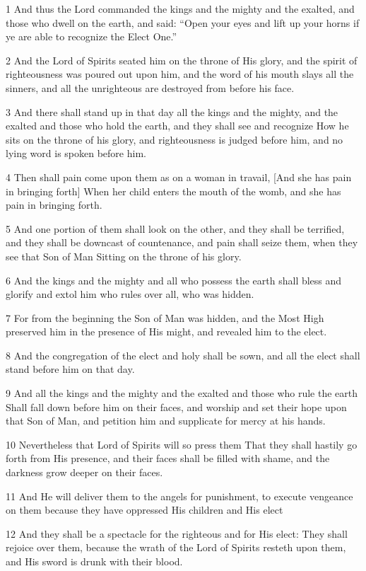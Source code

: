 \par 1 And thus the Lord commanded the kings and the mighty and the exalted, and those who dwell on the earth, and said: “Open your eyes and lift up your horns if ye are able to recognize the Elect One.”
\par 2 And the Lord of Spirits seated him on the throne of His glory, and the spirit of righteousness was poured out upon him, and the word of his mouth slays all the sinners, and all the unrighteous are destroyed from before his face.
\par 3 And there shall stand up in that day all the kings and the mighty, and the exalted and those who hold the earth, and they shall see and recognize How he sits on the throne of his glory, and righteousness is judged before him, and no lying word is spoken before him.
\par 4 Then shall pain come upon them as on a woman in travail, [And she has pain in bringing forth] When her child enters the mouth of the womb, and she has pain in bringing forth.
\par 5 And one portion of them shall look on the other, and they shall be terrified, and they shall be downcast of countenance, and pain shall seize them, when they see that Son of Man Sitting on the throne of his glory.
\par 6 And the kings and the mighty and all who possess the earth shall bless and glorify and extol him who rules over all, who was hidden.
\par 7 For from the beginning the Son of Man was hidden, and the Most High preserved him in the presence of His might, and revealed him to the elect.
\par 8 And the congregation of the elect and holy shall be sown, and all the elect shall stand before him on that day.
\par 9 And all the kings and the mighty and the exalted and those who rule the earth Shall fall down before him on their faces, and worship and set their hope upon that Son of Man, and petition him and supplicate for mercy at his hands.
\par 10 Nevertheless that Lord of Spirits will so press them That they shall hastily go forth from His presence, and their faces shall be filled with shame, and the darkness grow deeper on their faces.
\par 11 And He will deliver them to the angels for punishment, to execute vengeance on them because they have oppressed His children and His elect
\par 12 And they shall be a spectacle for the righteous and for His elect: They shall rejoice over them, because the wrath of the Lord of Spirits resteth upon them, and His sword is drunk with their blood.

